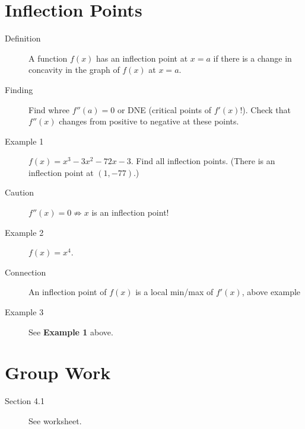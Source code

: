 \documentclass[11pt]{article}
\begin{document}
\drawtitle

\section*{Inflection Points}

\begin{description}
\item[Definition] A function $f(x)$ has an inflection point at $x=a$
  if there is a change in concavity in the graph of $f(x)$ at $x=a$.
\item[Finding] Find whree $f''(a)=0$ or DNE (critical points of
  $f'(x)$!). Check that $f''(x)$ changes from positive to negative at
  these points.
\item[Example 1] $f(x)=x^3-3x^2-72x-3$.  Find all inflection
  points. (There is an inflection point at $(1, -77)$.)
\item[Caution] $f''(x)=0\not \Rightarrow x$ is an inflection point!
\item[Example 2] $f(x)=x^4$.
\item[Connection] An inflection point of $f(x)$ is a local min/max of
  $f'(x)$, above example
\item[Example 3] See \textbf{Example 1} above.
\end{description}

\section*{Group Work}
\begin{description}
\item[Section 4.1] See worksheet.
\end{description}
\end{document}

